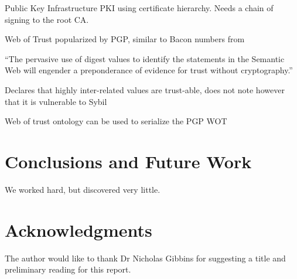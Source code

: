 \documentclass{acm_proc_article-sp}
\begin{document}
Public Key Infrastructure PKI using certificate hierarchy.
Needs a chain of signing to the root CA.

Web of Trust popularized by PGP, similar to Bacon numbers from \cite{golbeck_trust_2003}

``The pervasive use of digest values to identify the statements in the Semantic Web will engender a preponderance of evidence for trust without cryptography.''

Declares that highly inter-related values are trust-able, does not note however that it is vulnerable to Sybil\cite{douceur_sybil_2002}
\cite{reagle_key_2002}

Web of trust ontology can be used to serialize the PGP WOT
\cite{_web_2004}

\section{Conclusions and Future Work}
We worked hard, but discovered very little.

\section{Acknowledgments}
The author would like to thank Dr Nicholas Gibbins for suggesting a title and preliminary reading for this report.

%


%
%
\end{document}
